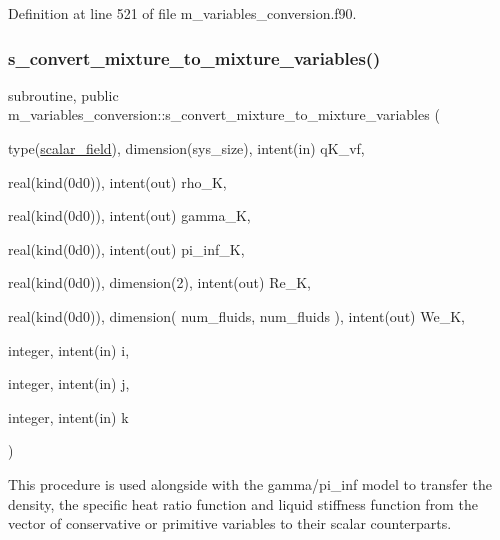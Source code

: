Definition at line 521 of file m\+\_\+variables\+\_\+conversion.\+f90.

\mbox{\label{namespacem__variables__conversion_a613c09e8438e535e8c13f15282493793}} 
\subsubsection{\texorpdfstring{s\+\_\+convert\+\_\+mixture\+\_\+to\+\_\+mixture\+\_\+variables()}{s\_convert\_mixture\_to\_mixture\_variables()}}
{\footnotesize\ttfamily subroutine, public m\+\_\+variables\+\_\+conversion\+::s\+\_\+convert\+\_\+mixture\+\_\+to\+\_\+mixture\+\_\+variables (\begin{DoxyParamCaption}\item[{type(\hyperlink{structm__derived__types_1_1scalar__field}{scalar\+\_\+field}), dimension(sys\+\_\+size), intent(in)}]{q\+K\+\_\+vf,  }\item[{real(kind(0d0)), intent(out)}]{rho\+\_\+K,  }\item[{real(kind(0d0)), intent(out)}]{gamma\+\_\+K,  }\item[{real(kind(0d0)), intent(out)}]{pi\+\_\+inf\+\_\+K,  }\item[{real(kind(0d0)), dimension(2), intent(out)}]{Re\+\_\+K,  }\item[{real(kind(0d0)), dimension( num\+\_\+fluids,                                         num\+\_\+fluids  ), intent(out)}]{We\+\_\+K,  }\item[{integer, intent(in)}]{i,  }\item[{integer, intent(in)}]{j,  }\item[{integer, intent(in)}]{k }\end{DoxyParamCaption})}



This procedure is used alongside with the gamma/pi\+\_\+inf model to transfer the density, the specific heat ratio function and liquid stiffness function from the vector of conservative or primitive variables to their scalar counterparts. 


